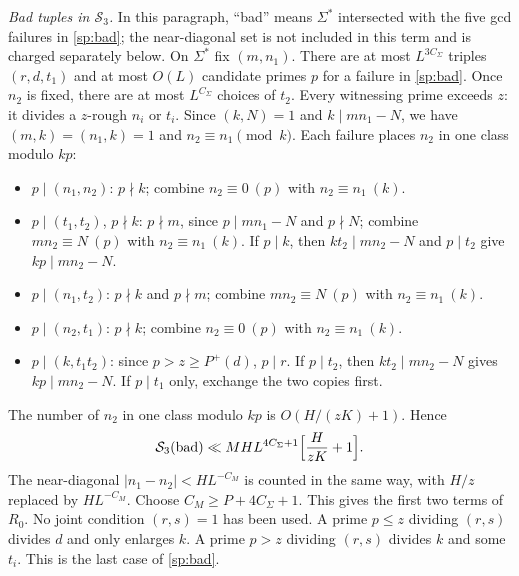 \emph{Bad tuples in $\mathcal S_3$.} In this paragraph, ``bad'' means
$\Sigma^*$ intersected with the five gcd failures in \eqref{sp:bad}; the
near-diagonal set is not included in this term and is charged separately
below. On $\Sigma^*$ fix $(m,n_1)$. There are at
most $L^{3C_\Sigma}$ triples $(r,d,t_1)$ and at most $O(L)$ candidate primes
$p$ for a failure in \eqref{sp:bad}. Once $n_2$ is fixed, there are at most
$L^{C_\Sigma}$ choices of $t_2$. Every witnessing prime exceeds $z$: it divides a
$z$-rough $n_i$ or $t_i$. Since $(k,N)=1$ and $k\mid mn_1-N$, we have
$(m,k)=(n_1,k)=1$ and $n_2\equiv n_1\pmod k$. Each failure places $n_2$ in
one class modulo $kp$:
\begin{itemize}
 \item $p\mid(n_1,n_2)$: $p\nmid k$; combine $n_2\equiv0\ (p)$ with $n_2\equiv n_1\ (k)$.
 \item $p\mid(t_1,t_2)$, $p\nmid k$: $p\nmid m$, since $p\mid mn_1-N$ and $p\nmid N$;
 combine $mn_2\equiv N\ (p)$ with $n_2\equiv n_1\ (k)$. If $p\mid k$, then
 $kt_2\mid mn_2-N$ and $p\mid t_2$ give $kp\mid mn_2-N$.
 \item $p\mid(n_1,t_2)$: $p\nmid k$ and $p\nmid m$; combine $mn_2\equiv N\ (p)$ with $n_2\equiv n_1\ (k)$.
 \item $p\mid(n_2,t_1)$: $p\nmid k$; combine $n_2\equiv0\ (p)$ with $n_2\equiv n_1\ (k)$.
 \item $p\mid(k,t_1t_2)$: since $p>z\ge P^+(d)$, $p\mid r$. If $p\mid t_2$, then
 $kt_2\mid mn_2-N$ gives $kp\mid mn_2-N$. If $p\mid t_1$ only, exchange
 the two copies first.
\end{itemize}
The number of $n_2$ in one class modulo $kp$ is $O(H/(zK)+1)$. Hence
\begin{equation}\label{sp:bad-s3}
 \mathcal S_3(\text{bad})\ll MHL^{4C_\Sigma+1}\Bigl[\frac H{zK}+1\Bigr].
\end{equation}
The near-diagonal $|n_1-n_2|<HL^{-C_M}$ is counted in the same way, with
$H/z$ replaced by $HL^{-C_M}$. Choose $C_M\ge P+4C_\Sigma+1$. This gives the
first two terms of $R_0$. No joint condition $(r,s)=1$ has been used. A
prime $p\le z$ dividing $(r,s)$ divides $d$ and only enlarges $k$. A
prime $p>z$ dividing $(r,s)$ divides $k$ and some $t_i$. This is the last
case of \eqref{sp:bad}.

